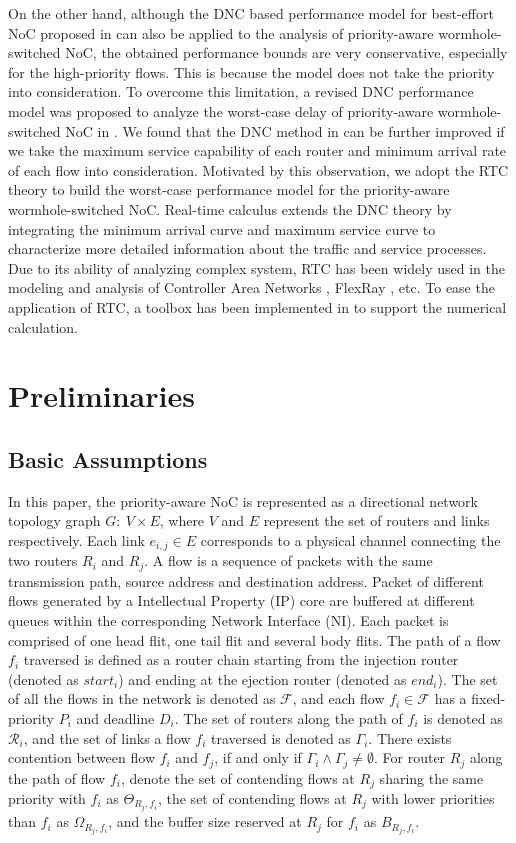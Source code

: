 \documentclass[preprint]{elsarticle}
\begin{document}
On the other hand, although the DNC based performance model for best-effort NoC proposed in \cite{qian2009analysis} can also be applied to the analysis of priority-aware wormhole-switched NoC, the obtained performance bounds are very conservative, especially for the high-priority flows. This is because the model does not take the priority into consideration. To overcome this limitation, a revised DNC performance model was proposed to analyze the worst-case delay of priority-aware wormhole-switched NoC in \cite{Qian489900}. We found that the DNC method in \cite{Qian489900} can be further improved if we take the maximum service capability of each router and minimum arrival rate of each flow into consideration. Motivated by this observation, we adopt the RTC theory \cite{1253607} to build the worst-case performance model for the priority-aware wormhole-switched NoC. Real-time calculus extends the DNC theory \cite{Boudec2001Network} by integrating the minimum arrival curve and maximum service curve to characterize more detailed information about the traffic and service processes. Due to its ability of analyzing complex system, RTC has been widely used in the modeling and analysis of Controller Area Networks \cite{4617308}, FlexRay \cite{Hagiescu:2007:PAF:1278480.1278554}, etc. To ease the application of RTC, a toolbox has been implemented in \cite{rtc} to support the numerical calculation.

\section{Preliminaries}\label{model}
\subsection{Basic Assumptions}
In this paper, the priority-aware NoC is represented as a directional network topology graph $G:\ V\times E$, where $V$ and $E$ represent the set of routers and links respectively. Each link $e_{i,j}\in E$ corresponds to a physical channel connecting the two routers $R_i$ and $R_j$. A flow is a sequence of packets with the same transmission path, source address and destination address. Packet of different flows generated by a Intellectual Property (IP) core are buffered at different queues within the corresponding Network Interface (NI). Each packet is comprised of one head flit, one tail flit and several body flits. The path of a flow $f_i$ traversed is defined as a router chain starting from the injection router (denoted as $start_i$) and ending at the ejection router (denoted as $end_i$). The set of all the flows in the network is denoted as $\mathcal{F}$, and each flow $f_i\in\mathcal{F}$ has a fixed-priority $P_i$ and deadline $D_i$. The set of routers along the path of $f_i$ is denoted as $\mathcal{R}_i$, and the set of links a flow $f_i$ traversed is denoted as $\Gamma_i$. There exists contention between flow $f_i$ and $f_j$, if and only if $\Gamma_i\wedge\Gamma_j\neq\emptyset$. For router $R_j$ along the path of flow $f_i$, denote the set of contending flows at $R_j$ sharing the same priority with $f_i$ as $\Theta_{R_j,f_i}$, the set of contending flows at $R_j$ with lower priorities than $f_i$ as $\Omega_{R_j,f_i}$, and the buffer size reserved at $R_j$ for $f_i$ as $B_{R_j,f_i}$.
\end{document}
